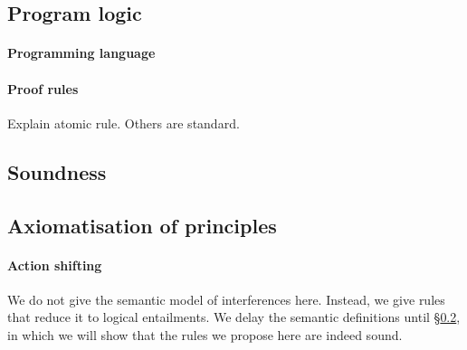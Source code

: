 

\subsection{Program logic}

\paragraph{Programming language}

\paragraph{Proof rules}
Explain atomic rule. Others are standard.



\subsection{Soundness}
\label{sec:soundness}


\subsection{Axiomatisation of \colosl principles}

\paragraph{Action shifting}
We do not give the semantic model of interferences here. Instead, we
give rules that reduce it to logical entailments. We delay the
semantic definitions until \S\ref{sec:soundness}, in which we will
show that the rules we propose here are indeed sound.

